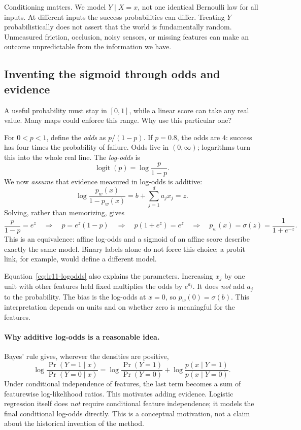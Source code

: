 Conditioning matters. We model $Y\mid X=x$, not one identical Bernoulli law for
all inputs. At different inputs the success probabilities can differ. Treating
$Y$ probabilistically does not assert that the world is fundamentally random.
Unmeasured friction, occlusion, noisy sensors, or missing features can make an
outcome unpredictable from the information we have.

\subsection{Inventing the sigmoid through odds and evidence}
A useful probability must stay in $[0,1]$, while a linear score can take any real
value. Many maps could enforce this range. Why use this particular one?

For $0<p<1$, define the \emph{odds} as $p/(1-p)$. If $p=0.8$, the odds are $4$:
success has four times the probability of failure. Odds live in $(0,\infty)$;
logarithms turn this into the whole real line. The \emph{log-odds} is
\[
\operatorname{logit}(p)=\log\frac{p}{1-p}.
\]
We now \emph{assume} that evidence measured in log-odds is additive:
\begin{equation}
\log\frac{p_w(x)}{1-p_w(x)}=b+\sum_{j=1}^d a_jx_j=z.
\label{eq:lr11-logodds}
\end{equation}
Solving, rather than memorizing, gives
\[
\frac{p}{1-p}=e^z
\quad\Longrightarrow\quad p=e^z(1-p)
\quad\Longrightarrow\quad p(1+e^z)=e^z
\quad\Longrightarrow\quad
\boxed{p_w(x)=\sigma(z)=\frac{1}{1+e^{-z}}.}
\]
This is an equivalence: affine log-odds and a sigmoid of an affine score describe
exactly the same model. Binary labels alone do not force this choice; a probit
link, for example, would define a different model.

Equation~\eqref{eq:lr11-logodds} also explains the parameters. Increasing $x_j$ by
one unit with other features held fixed multiplies the odds by $e^{a_j}$.
It does \emph{not} add $a_j$ to the probability. The bias is the log-odds at
$x=0$, so $p_w(0)=\sigma(b)$. This interpretation depends on units and on whether
zero is meaningful for the features.

\paragraph{Why additive log-odds is a reasonable idea.}
Bayes' rule gives, wherever the densities are positive,
\[
\log\frac{\Pr(Y=1\mid x)}{\Pr(Y=0\mid x)}
=\log\frac{\Pr(Y=1)}{\Pr(Y=0)}
 +\log\frac{p(x\mid Y=1)}{p(x\mid Y=0)}.
\]
Under conditional independence of features, the last term becomes a sum of
featurewise log-likelihood ratios. This motivates adding evidence. Logistic
regression itself does \emph{not} require conditional feature independence; it
models the final conditional log-odds directly. This is a conceptual motivation,
not a claim about the historical invention of the method.

